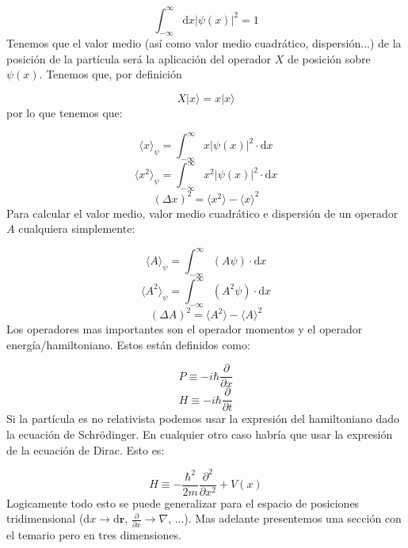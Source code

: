 \documentclass[12pt]{book}
\numberwithin{equation}{chapter}
\numberwithin{figure}{chapter}
\newcommand{\parentesis}[1]{\left( #1  \right)}
\newcommand{\parciales}[2]{\frac{\partial #1}{\partial #2}}
\newcommand{\D}{\mathrm{d}}
\newcommand{\intinf}{\int_{-\infty}^{\infty}}
\newcommand{\rn}{\mathbf{r}}
\begin{document}
\begin{equation}
\intinf \D x |\psi(x)|^2 = 1
\end{equation}
Tenemos que el valor medio (así como valor medio cuadrático, dispersión...) de la posición de la partícula será la aplicación del operador $X$ de posición sobre $\psi(x)$. Tenemos que, por definición

\begin{equation}
X  |x\rangle = x |x\rangle
\end{equation}
por lo que tenemos que:

\begin{equation}
\langle x \rangle_\psi = \intinf x|\psi (x)|^2 \cdot \D x  
\end{equation}
\begin{equation}
\langle x^2 \rangle_\psi = \intinf x^2 |\psi (x)|^2 \cdot \D x 
\end{equation}
\begin{equation}
(\Delta x)^2 = \langle x^2 \rangle - \langle x \rangle^2
\end{equation}
Para calcular el valor medio, valor medio cuadrático e dispersión de un operador $A$ cualquiera simplemente: 

\begin{equation}
\langle A \rangle_\psi = \intinf \parentesis{A \psi}  \cdot \D x  
\end{equation}
\begin{equation}
\langle A^2 \rangle_\psi = \intinf \parentesis{A^2 \psi}  \cdot \D x 
\end{equation}
\begin{equation}
(\Delta A)^2 = \langle A^2 \rangle - \langle A \rangle^2
\end{equation}
Los operadores mas importantes son el operador momentos y el operador energía/hamiltoniano. Estos están definidos como:

\begin{equation}
P \equiv - i \hbar \parciales{}{x}
\end{equation}
\begin{equation}
H \equiv - i  \hbar \parciales{}{t} 
\end{equation}
Si la partícula es no relativista podemos usar la expresión del hamiltoniano dado la ecuación de Schrödinger. En cualquier otro caso habría que usar la expresión de la ecuación de Dirac. Esto es:

\begin{equation}
H \equiv -\frac{\hbar^2}{2m} \parciales{^2}{x^2} + V(x)
\end{equation}
Logicamente todo esto se puede generalizar para el espacio de posiciones tridimensional ($\D x \rightarrow \D \rn$, $\parciales{}{x}  \rightarrow \nabla$, ...). Mas adelante presentemos una sección con el temario pero en tres dimensiones.
\end{document}
